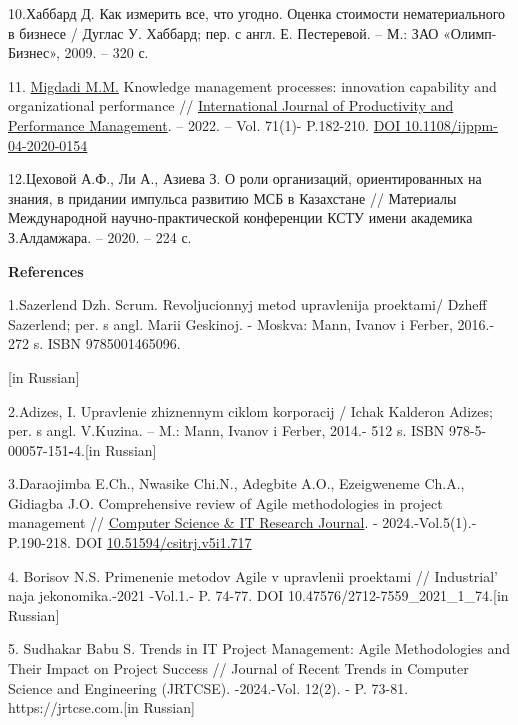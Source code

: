 10.Хаббард Д. Как измерить все, что угодно. Оценка стоимости
нематериального в бизнесе / Дуглас У. Хаббард; пер. с англ. Е.
Пестеревой. -- М.: ЗАО «Олимп-Бизнес», 2009. -- 320 с.

11.
\href{https://www.emerald.com/insight/search?q=Mahmoud\%20Mohammad\%20Migdadi}{Migdadi
M.M.} Knowledge management processes: innovation capability and
organizational performance //
\href{https://www.emerald.com/insight/publication/issn/1741-0401}{International
Journal of Productivity and Performance Management}. -- 2022. -- Vol.
71(1)- P.182-210. \href{https://doi.org/10.1108/ijppm-04-2020-0154}{DOI
10.1108/ijppm-04-2020-0154}

12.Цеховой А.Ф., Ли А., Азиева З. О роли организаций, ориентированных на
знания, в придании импульса развитию МСБ в Казахстане // Материалы
Международной научно-практической конференции КСТУ имени академика
З.Алдамжара. -- 2020. -- 224 с.

{\bfseries References}

1.Sazerlend Dzh. Scrum. Revoljucionnyj metod upravlenija proektami/
Dzheff Sazerlend; per. s angl. Marii Geskinoj. - Moskva: Mann, Ivanov i
Ferber, 2016.- 272 s. ISBN 9785001465096.

{[}in Russian{]}

2.Adizes, I. Upravlenie zhiznennym ciklom korporacij / Ichak Kalderon
Adizes; per. s angl. V.Kuzina. -- M.: Mann, Ivanov i Ferber, 2014.- 512
s. ISBN 978-5-00057-151{\bfseries -}4.{[}in Russian{]}

3.Daraojimba E.Ch., Nwasike Chi.N., Adegbite A.O., Ezeigweneme Ch.A.,
Gidiagba J.O. Comprehensive review of Agile methodologies in project
management //
\href{https://www.researchgate.net/journal/Computer-Science-IT-Research-Journal-2709-0051?_tp=eyJjb250ZXh0Ijp7ImZpcnN0UGFnZSI6Il9kaXJlY3QiLCJwYWdlIjoicHVibGljYXRpb24iLCJwcmV2aW91c1BhZ2UiOiJfZGlyZWN0In19}{Computer
Science \& IT Research Journal}. - 2024.-Vol.5(1).- P.190-218. DOI
\href{http://dx.doi.org/10.51594/csitrj.v5i1.717}{10.51594/csitrj.v5i1.717}

4. Borisov N.S. Primenenie metodov Agile v upravlenii proektami //
Industrial' naja jekonomika.-2021 -Vol.1.- P. 74-77. DOI
10.47576/2712-7559\_2021\_1\_74.{[}in Russian{]}

5. Sudhakar Babu S. Trends in IT Project Management: Agile Methodologies
and Their Impact on Project Success // Journal of Recent Trends in
Computer Science and Engineering (JRTCSE). -2024.-Vol. 12(2). - P.
73-81. https://jrtcse.com.{[}in Russian{]}

